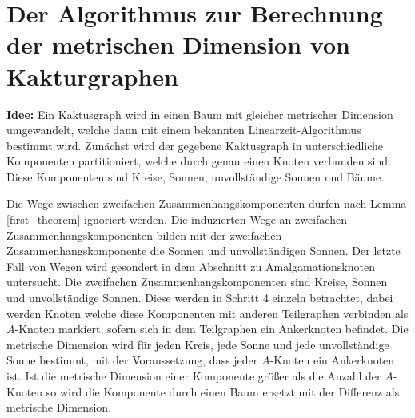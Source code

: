 \section{Der Algorithmus zur Berechnung der metrischen Dimension von Kakturgraphen}
\textbf{Idee:} Ein Kaktusgraph wird in einen Baum mit gleicher metrischer Dimension umgewandelt, welche dann mit einem bekannten Linearzeit-Algorithmus bestimmt wird.\newline\newline
Zunächst wird der gegebene Kaktusgraph in unterschiedliche Komponenten partitioniert, welche durch genau einen Knoten verbunden sind. Diese Komponenten sind Kreise, Sonnen, unvollständige Sonnen und Bäume.\newline\newline

Die Wege zwischen zweifachen Zusammenhangskomponenten dürfen nach Lemma \ref{first_theorem} ignoriert werden. Die induzierten Wege an zweifachen Zusammenhangskomponenten bilden mit der zweifachen Zusammenhangskomponente die Sonnen und unvollständigen Sonnen. Der letzte Fall von Wegen wird gesondert in dem Abschnitt zu Amalgamationsknoten untersucht.\newline\newline
Die zweifachen Zusammenhangskomponenten sind Kreise, Sonnen und unvollständige Sonnen. Diese werden in Schritt 4 einzeln betrachtet, dabei werden Knoten welche diese Komponenten mit anderen Teilgraphen verbinden als $A$-Knoten markiert, sofern sich in dem Teilgraphen ein Ankerknoten befindet. Die metrische Dimension wird für jeden Kreis, jede Sonne und jede unvollständige Sonne bestimmt, mit der Voraussetzung, dass jeder $A$-Knoten ein Ankerknoten ist.\newline
Ist die metrische Dimension einer Komponente größer als die Anzahl der $A$-Knoten so wird die Komponente durch einen Baum ersetzt mit der Differenz als metrische Dimension.\newline\newline

